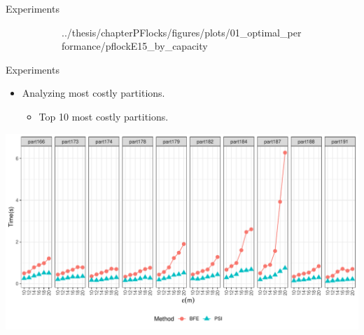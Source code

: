 \begin{frame}{Experiments}
\begin{figure}
\begin{subfigure}[t]{0.32\textwidth}
{            {../thesis/chapterPFlocks/figures/plots/01_optimal_performance/pflockE15_by_capacity}}
        \end{subfigure}
        \begin{subfigure}[t]{0.32\textwidth}
        \end{subfigure}
    \end{figure}
\end{frame}

\begin{frame}{Experiments}
    \begin{itemize} \item Analyzing most costly partitions.
        \begin{itemize}
            \item Top 10 most costly partitions.
        \end{itemize}
    \end{itemize} \vspace{0.25cm}

    \centering
    \includegraphics[width=\textwidth]
            {../thesis/chapterPFlocks/figures/plots/03_top_time_partitions/top_time_partitions}

\end{frame}

